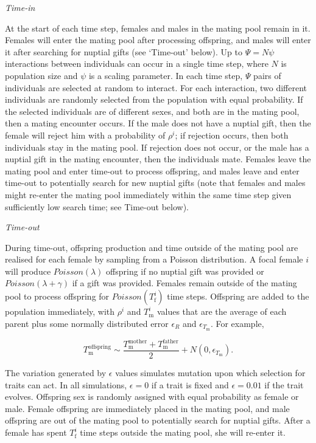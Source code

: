 \documentclass[
]{article}
\begin{document}
\emph{Time-in}

At the start of each time step, females and males in the mating pool
remain in it. Females will enter the mating pool after processing
offspring, and males will enter it after searching for nuptial gifts
(see `Time-out' below). Up to \(\Psi = N\psi\) interactions between
individuals can occur in a single time step, where \(N\) is population
size and \(\psi\) is a scaling parameter. In each time step, \(\Psi\)
pairs of individuals are selected at random to interact. For each
interaction, two different individuals are randomly selected from the
population with equal probability. If the selected individuals are of
different sexes, and both are in the mating pool, then a mating
encounter occurs. If the male does not have a nuptial gift, then the
female will reject him with a probability of \(\rho^{i}\); if rejection
occurs, then both individuals stay in the mating pool. If rejection does
not occur, or the male has a nuptial gift in the mating encounter, then
the individuals mate. Females leave the mating pool and enter time-out
to process offspring, and males leave and enter time-out to potentially
search for new nuptial gifts (note that females and males might re-enter
the mating pool immediately within the same time step given sufficiently
low search time; see Time-out below).

\emph{Time-out}

During time-out, offspring production and time outside of the mating
pool are realised for each female by sampling from a Poisson
distribution. A focal female \(i\) will produce \(Poisson(\lambda)\)
offspring if no nuptial gift was provided or
\(Poisson(\lambda + \gamma)\) if a gift was provided. Females remain
outside of the mating pool to process offspring for
\(Poisson(T^{i}_{\mathrm{f}})\) time steps. Offspring are added to the
population immediately, with \(\rho^{i}\) and \(T^{i}_{\mathrm{m}}\)
values that are the average of each parent plus some normally
distributed error \(\epsilon_{R}\) and \(\epsilon_{T_{\mathrm{m}}}\).
For example,

\[T^{\mathrm{offspring}}_{\mathrm{m}} \sim \frac{T^{\mathrm{mother}}_{\mathrm{m}}  + T^{\mathrm{father}}_{\mathrm{m}}}{2} + N\left(0, \epsilon_{T_{\mathrm{m}}} \right).\]

The variation generated by \(\epsilon\) values simulates mutation upon
which selection for traits can act. In all simulations, \(\epsilon = 0\)
if a trait is fixed and \(\epsilon = 0.01\) if the trait evolves.
Offspring sex is randomly assigned with equal probability as female or
male. Female offspring are immediately placed in the mating pool, and
male offspring are out of the mating pool to potentially search for
nuptial gifts. After a female has spent \(T^{i}_{\mathrm{f}}\) time
steps outside the mating pool, she will re-enter it.
\end{document}
